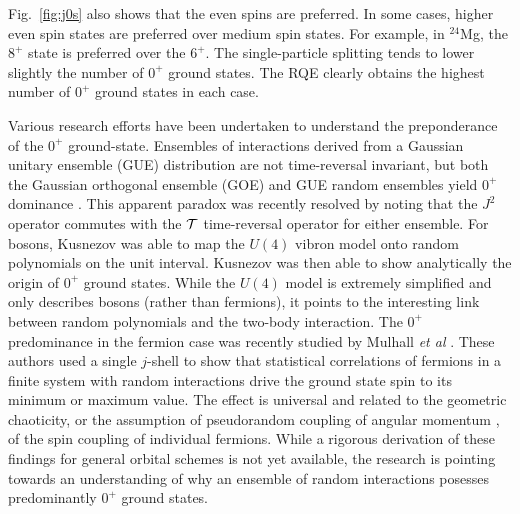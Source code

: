 \documentclass[rmp,preprint,aps,floatfix]{revtex4}
\begin{document}
Fig.~\ref{fig:j0s} also shows that the even spins are preferred. 
In some cases, higher even spin states are preferred over medium
spin states. For example, in $^{24}$Mg, the $8^+$ state is preferred
over the $6^+$. The single-particle splitting tends to lower slightly
the number of $0^+$ ground states. The RQE clearly obtains the highest
number of $0^+$ ground states in each case. 

Various research efforts have been undertaken to 
understand the preponderance of the $0^+$ ground-state. 
Ensembles of interactions derived from a Gaussian unitary ensemble (GUE) 
distribution are not
time-reversal invariant, but both the Gaussian orthogonal ensemble (GOE) 
and GUE random ensembles 
yield $0^+$ dominance \cite{bijker99}. This apparent paradox was recently
resolved \cite{vz02} by noting that the $J^2$ operator commutes with 
the ${\cal T}$ time-reversal operator for either ensemble. 
For bosons, Kusnezov \cite{kus00} was able to map the $U(4)$ vibron
model onto random polynomials on the unit interval. 
Kusnezov was then able to show analytically the origin of $0^+$ ground
states. While the $U(4)$ model is extremely simplified and only describes
bosons (rather than fermions),  it points to the 
interesting link between random polynomials and the two-body interaction. 
The $0^+$ predominance in the fermion case was recently studied by 
Mulhall {\em et al} \cite{mulhall00}. These authors used  
a single $j$-shell to show that statistical 
correlations of fermions in a finite system with random interactions 
drive the ground state spin to its minimum or 
maximum value. The effect is universal and related to the 
geometric chaoticity, or the assumption of pseudorandom coupling 
of angular momentum \cite{volodya1996}, 
of the spin coupling of 
individual fermions. While a rigorous derivation of these findings for 
general orbital schemes is not yet available, the research is pointing towards
an understanding of why an ensemble of 
random interactions posesses predominantly $0^+$ ground states. 
\end{document}
